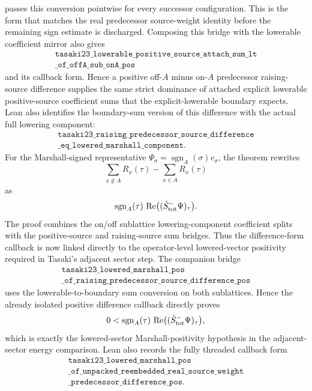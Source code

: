 \documentclass[a4paper,11pt]{article}
\begin{document}
passes this conversion pointwise for every successor configuration.
This is the form that matches the real predecessor source-weight
identity before the remaining sign estimate is discharged.
Composing this bridge with the lowerable coefficient mirror also gives
\[
\begin{gathered}
\texttt{tasaki23\_lowerable\_positive\_source\_attach\_sum\_lt}\\
\texttt{\_of\_offA\_sub\_onA\_pos}
\end{gathered}
\]
and its callback form.  Hence a positive off-\(A\) minus on-\(A\)
predecessor raising-source difference supplies the same strict dominance
of attached explicit lowerable positive-source coefficient sums that the
explicit-lowerable boundary expects.
Lean also identifies the boundary-sum version of this difference with
the actual full lowering component:
\[
\begin{gathered}
\texttt{tasaki23\_raising\_predecessor\_source\_difference}\\
\texttt{\_eq\_lowered\_marshall\_component}.
\end{gathered}
\]
For the Marshall-signed representative
\(\Psi_\sigma=\operatorname{sgn}_A(\sigma)v_\sigma\), the theorem
rewrites
\[
  \sum_{x\notin A} R_x(\tau)-\sum_{x\in A}R_x(\tau)
\]
as
\[
  \operatorname{sgn}_A(\tau)\,
  \operatorname{Re}\bigl((\hat S^-_{\rm tot}\Psi)_\tau\bigr).
\]
The proof combines the on/off sublattice lowering-component coefficient
splits with the positive-source and raising-source sum bridges.  Thus
the difference-form callback is now linked directly to the
operator-level lowered-vector positivity required in Tasaki's adjacent
sector step.
The companion bridge
\[
\begin{gathered}
\texttt{tasaki23\_lowered\_marshall\_pos}\\
\texttt{\_of\_raising\_predecessor\_source\_difference\_pos}
\end{gathered}
\]
uses the lowerable-to-boundary sum conversion on both sublattices.
Hence the already isolated positive difference callback directly proves
\[
  0<
  \operatorname{sgn}_A(\tau)\,
  \operatorname{Re}\bigl((\hat S^-_{\rm tot}\Psi)_\tau\bigr),
\]
which is exactly the lowered-sector Marshall-positivity hypothesis in
the adjacent-sector energy comparison.
Lean also records the fully threaded callback form
\[
\begin{gathered}
\texttt{tasaki23\_lowered\_marshall\_pos}\\
\texttt{\_of\_unpacked\_reembedded\_real\_source\_weight}\\
\texttt{\_predecessor\_difference\_pos}.
\end{gathered}
\]
\end{document}
